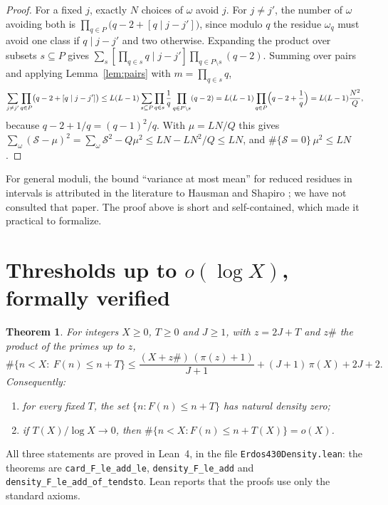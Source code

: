 \documentclass[11pt,letterpaper]{article}
\newtheorem{theorem}{Theorem}
\theoremstyle{remark}
\newcommand{\cS}{\mathcal S}
\begin{document}
\begin{proof}
For a fixed $j$, exactly $N$ choices of $\omega$ avoid $j$. For $j\ne j'$, the
number of $\omega$ avoiding both is
$\prod_{q\in P}\bigl(q-2+[q\mid j-j']\bigr)$, since modulo $q$ the residue
$\omega_q$ must avoid one class if $q\mid j-j'$ and two otherwise. Expanding the
product over subsets $s\subseteq P$ gives
$\sum_s [\prod_{q\in s}q\mid j-j']\prod_{q\in P\setminus s}(q-2)$. Summing over
pairs and applying Lemma~\ref{lem:pairs} with $m=\prod_{q\in s}q$,
\[
\sum_{j\ne j'}\prod_{q\in P}\bigl(q-2+[q\mid j-j']\bigr)
\le L(L-1)\sum_{s\subseteq P}\prod_{q\in s}\frac1q\prod_{q\in P\setminus s}(q-2)
=L(L-1)\prod_{q\in P}\Bigl(q-2+\frac1q\Bigr)=L(L-1)\frac{N^2}{Q},
\]
because $q-2+1/q=(q-1)^2/q$. With $\mu=LN/Q$ this gives
$\sum_\omega(\cS-\mu)^2=\sum_\omega\cS^2-Q\mu^2\le LN-LN^2/Q\le LN$, and
$\#\{\cS=0\}\,\mu^2\le LN$.
\end{proof}

For general moduli, the bound ``variance at most mean'' for reduced residues in
intervals is attributed in the literature to Hausman and Shapiro \cite{hs}; we
have not consulted that paper. The proof above is short and self-contained,
which made it practical to formalize.

\section{\texorpdfstring{Thresholds up to $o(\log X)$, formally verified}{Thresholds up to o(log X), formally verified}}

\begin{theorem}\label{thm:lean}
For integers $X\ge0$, $T\ge0$ and $J\ge1$, with $z=2J+T$ and $z\#$ the product
of the primes up to $z$,
\[
\#\{n<X:\ F(n)\le n+T\}\le \frac{(X+z\#)\,(\pi(z)+1)}{J+1}+(J+1)\,\pi(X)+2J+2.
\]
Consequently:
\begin{enumerate}
\item for every fixed $T$, the set $\{n: F(n)\le n+T\}$ has natural density zero;
\item if $T(X)/\log X\to0$, then $\#\{n<X: F(n)\le n+T(X)\}=o(X)$.
\end{enumerate}
\end{theorem}

All three statements are proved in Lean~4, in the file
\texttt{Erdos430Density.lean}: the theorems are
\texttt{card\_F\_le\_add\_le}, \texttt{density\_F\_le\_add} and
\texttt{density\_F\_le\_add\_of\_tendsto}. Lean reports that the proofs use only
the standard axioms.
\end{document}
